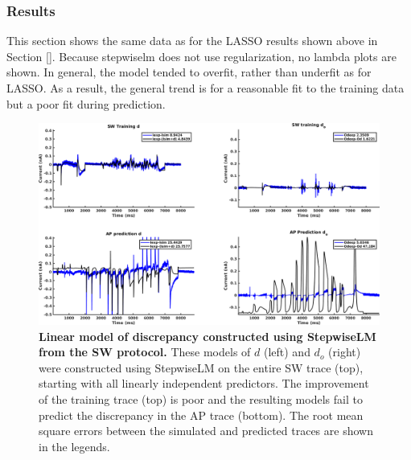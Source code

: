 \documentclass[11pt,a4paper,oneside]{article}
\begin{document}
\subsubsection{Results}\label{SubSubSec_StepwiseLM_Results}
This section shows the same data as for the LASSO results shown above in Section \ref{}. Because stepwiselm does not use regularization, no lambda plots are shown. In general, the model tended to overfit, rather than underfit as for LASSO. As a result, the general trend is for a reasonable fit to the training data but a poor fit during prediction.

\begin{figure}[t]
\begin{center}
\includegraphics[scale=0.42]{Figures/StepwiseLM_SW_AP_full_discrepancy.png}
\caption{\textbf{Linear model of discrepancy constructed using StepwiseLM from the SW protocol.} These models of $d$ (left) and $d_o$ (right) were constructed using StepwiseLM on the entire SW trace (top), starting with all linearly independent predictors. The improvement of the training trace (top) is poor and the resulting models fail to predict the discrepancy in the AP trace (bottom). The root mean square errors between the simulated and predicted traces are shown in the legends. } 
\label{Fig_StepwiseLM_SW_AP_full_discrepancy}
\end{center}
\end{figure}
\end{document}
